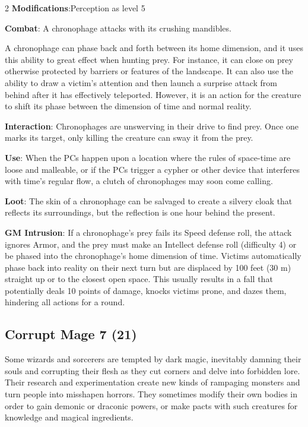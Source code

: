 \begin{multicols}{2}
\textbf{Modifications}:Perception as level 5

\textbf{Combat}: A chronophage attacks with its crushing mandibles.

A chronophage can phase back and forth between its home dimension, and it uses this ability to great effect when hunting prey. For instance, it can close on prey otherwise protected by barriers or features of the landscape. It can also use the ability to draw a victim’s attention and then launch a surprise attack from behind after it has effectively teleported. However, it is an action for the creature to shift its phase between the dimension of time and normal reality.

\textbf{Interaction}: Chronophages are unswerving in their drive to find prey. Once one marks its target, only killing the creature can sway it from the prey.

\textbf{Use}: When the PCs happen upon a location where the rules of space-time are loose and malleable, or if the PCs trigger a cypher or other device that interferes with time’s regular flow, a clutch of chronophages may soon come calling.

\textbf{Loot}: The skin of a chronophage can be salvaged to create a silvery cloak that reflects its surroundings, but the reflection is one hour behind the present.

\textbf{GM Intrusion}: If a chronophage’s prey fails its Speed defense roll, the attack ignores Armor, and the prey must make an Intellect defense roll (difficulty 4) or be phased into the chronophage’s home dimension of time. Victims automatically phase back into reality on their next turn but are displaced by 100 feet (30 m) straight up or to the closest open space. This usually results in a fall that potentially deals 10 points of damage, knocks victims prone, and dazes them, hindering all actions for a round.

\subsection{Corrupt Mage 7 (21)}

Some wizards and sorcerers are tempted by dark magic, inevitably damning their souls and corrupting their flesh as they cut corners and delve into forbidden lore. Their research and experimentation create new kinds of rampaging monsters and turn people into misshapen horrors. They sometimes modify their own bodies in order to gain demonic or draconic powers, or make pacts with such creatures for knowledge and magical ingredients. 


\end{multicols}
